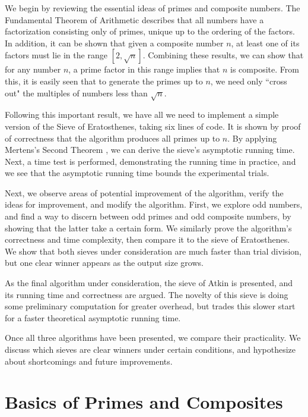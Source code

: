 \documentclass{amsart}
\theoremstyle{definition}
\theoremstyle{case}
\begin{document}
    We begin by reviewing the essential ideas of primes and composite numbers. The Fundamental Theorem of Arithmetic describes that all numbers have a factorization consisting only of primes, unique up to the ordering of the factors. In addition, it can be shown that given a composite number $n$, at least one of its factors must lie in the range $[2, \sqrt{n}]$. Combining these results, we can show that for any number $n$, a prime factor in this range implies that $n$ is composite. From this, it is easily seen that to generate the primes up to $n$, we need only ``cross out" the multiples of numbers less than $\sqrt{n}$.
    
    Following this important result, we have all we need to implement a simple version of the Sieve of Eratosthenes, taking six lines of code. It is shown by proof of correctness that the algorithm produces all primes up to $n$. By applying Mertens's Second Theorem \cite{mertens}, we can derive the sieve's asymptotic running time. Next, a time test is performed, demonstrating the running time in practice, and we see that the asymptotic running time bounds the experimental trials.
    
    Next, we observe areas of potential improvement of the algorithm, verify the ideas for improvement, and modify the algorithm. First, we explore odd numbers, and find a way to discern between odd primes and odd composite numbers, by showing that the latter take a certain form. We similarly prove the algorithm's correctness and time complexity, then compare it to the sieve of Eratosthenes. We show that both sieves under consideration are much faster than trial division, but one clear winner appears as the output size grows.
    
    As the final algorithm under consideration, the sieve of Atkin is presented, and its running time and correctness are argued. The novelty of this sieve is doing some preliminary computation for greater overhead, but trades this slower start for a faster theoretical asymptotic running time.
    
    Once all three algorithms have been presented, we compare their practicality. We discuss which sieves are clear winners under certain conditions, and hypothesize about shortcomings and future improvements.
    
    
    \section{Basics of Primes and Composites}
    
\end{document}
